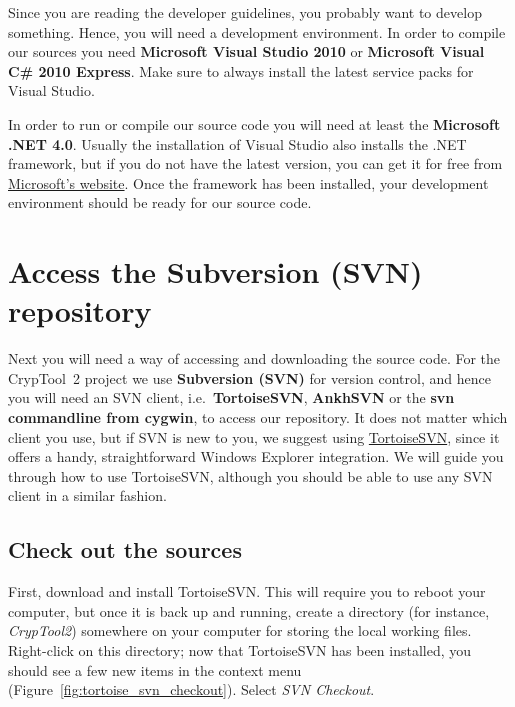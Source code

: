 Since you are reading the developer guidelines, you probably want to develop something. Hence, you will need a development environment. In order to compile our sources you need \textbf{Microsoft Visual Studio 2010} or \textbf{Microsoft Visual C\# 2010 Express}. Make sure to always install the latest service packs for Visual Studio.

In order to run or compile our source code you will need at least the \textbf{Microsoft .NET 4.0}. Usually the installation of Visual Studio also installs the .NET framework, but if you do not have the latest version, you can get it for free from \href{http://www.microsoft.com/downloads/details.aspx?FamilyID=9cfb2d51-5ff4-4491-b0e5-b386f32c0992}{Microsoft's website}. Once the framework has been installed, your development environment should be ready for our source code.
\clearpage

\section{Access the Subversion (SVN) repository}
\label{AccessingSubversion}

Next you will need a way of accessing and downloading the source code. For the CrypTool~2 project we use \textbf{Subversion (SVN)} for version control, and hence you will need an SVN client, i.e.\ \textbf{TortoiseSVN}, \textbf{AnkhSVN} or the \textbf{svn commandline from cygwin}, to access our repository. It does not matter which client you use, but if SVN is new to you, we suggest using \href{http://www.tortoisesvn.net/}{TortoiseSVN}, since it offers a handy, straightforward Windows Explorer integration. We will guide you through how to use TortoiseSVN, although you should be able to use any SVN client in a similar fashion.

\subsection{Check out the sources}
\label{CheckingOutTheSources}

First, download and install TortoiseSVN. This will require you to reboot your computer, but once it is back up and running, create a directory (for instance, \textit{CrypTool2}) somewhere on your computer for storing the local working files. Right-click on this directory; now that TortoiseSVN has been installed, you should see a few new items in the context menu (Figure~\ref{fig:tortoise_svn_checkout}). Select \textit{SVN Checkout}.

